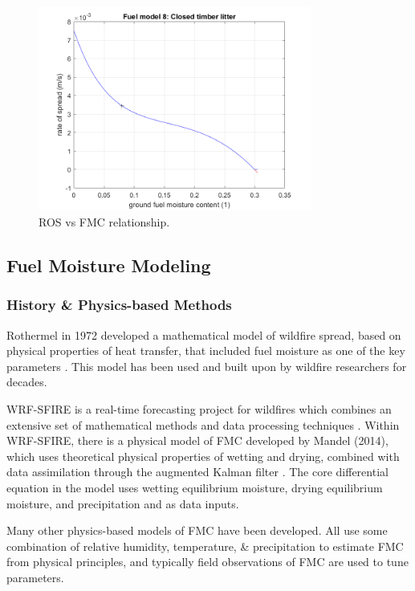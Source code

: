 \documentclass[11pt]{article}%
\begin{document}
\begin{figure}[ht]
    \centering
    \includegraphics[width=0.8\textwidth]{images/fuel8_ros_fm.png}
    \caption{ROS vs FMC relationship.}
    \label{fig:fmc_ros_fmc}
\end{figure}

\subsection{Fuel Moisture Modeling}
\subsubsection{History \& Physics-based Methods}

Rothermel in 1972 developed a mathematical model of wildfire spread, based on physical properties of heat transfer, that included fuel moisture as one of the key parameters \cite{Rothermel-1972-MMP}. This model has been used and built upon by wildfire researchers for decades. 

WRF-SFIRE is a real-time forecasting project for wildfires which combines an extensive set of mathematical methods and data processing techniques \cite{OpenWFM-2024-HTD}. Within WRF-SFIRE, there is a physical model of FMC developed by Mandel (2014), which uses theoretical physical properties of wetting and drying, combined with data assimilation through the augmented Kalman filter \cite{Mandel-2014-RAA}. The core differential equation in the model uses wetting equilibrium moisture, drying equilibrium moisture, and precipitation and as data inputs.

Many other physics-based models of FMC have been developed. All use some combination of relative humidity, temperature, \& precipitation to estimate FMC from physical principles, and typically field observations of FMC are used to tune parameters. \cite{Catchpole-1999-EFR,Nelson-2000-PDC, vanderKamp-2017-MFS}
\end{document}

